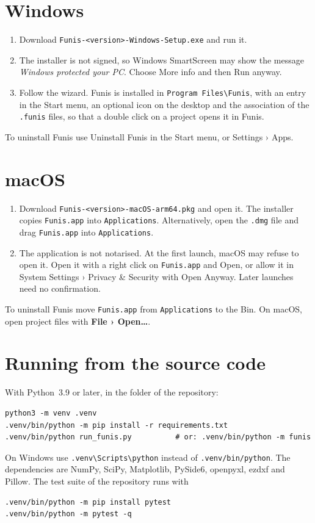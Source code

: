 \documentclass[fontsize=10.5pt,paper=a4,parskip=half,headings=normal,numbers=noenddot,
  open=any,bibliography=totoc,captions=tableheading]{scrreprt}
\numberwithin{figure}{chapter}
\numberwithin{table}{chapter}
\newcommand{\menu}[1]{{\sffamily\bfseries\color{ink}#1}}
\newcommand{\ui}[1]{{\sffamily\color{ink}#1}}
\newcommand{\file}[1]{\texttt{#1}}
\begin{document}
\section{Windows}

\begin{enumerate}
\item Download \file{Funis-<version>-Windows-Setup.exe} and run it.
\item The installer is not signed, so Windows SmartScreen may show the message \emph{Windows protected
your PC}. Choose \ui{More info} and then \ui{Run anyway}.
\item Follow the wizard. Funis is installed in \file{Program Files\textbackslash Funis}, with an entry
in the Start menu, an optional icon on the desktop and the association of the \file{.funis} files, so
that a double click on a project opens it in Funis.
\end{enumerate}
To uninstall Funis use \ui{Uninstall Funis} in the Start menu, or \ui{Settings › Apps}.

\section{macOS}

\begin{enumerate}
\item Download \file{Funis-<version>-macOS-arm64.pkg} and open it. The installer copies
\file{Funis.app} into \file{Applications}. Alternatively, open the \file{.dmg} file and drag
\file{Funis.app} into \file{Applications}.
\item The application is not notarised. At the first launch, macOS may refuse to open it. Open it with a
right click on \file{Funis.app} and \ui{Open}, or allow it in \ui{System Settings › Privacy \&
Security} with \ui{Open Anyway}. Later launches need no confirmation.
\end{enumerate}
To uninstall Funis move \file{Funis.app} from \file{Applications} to the Bin. On macOS, open project
files with \menu{File › Open…}.

\section{Running from the source code}\label{sec:source}

With Python~3.9 or later, in the folder of the repository:
\begin{verbatim}
python3 -m venv .venv
.venv/bin/python -m pip install -r requirements.txt
.venv/bin/python run_funis.py          # or: .venv/bin/python -m funis
\end{verbatim}
On Windows use \file{.venv\textbackslash Scripts\textbackslash python} instead of
\file{.venv/bin/python}. The dependencies are NumPy, SciPy, Matplotlib, PySide6, openpyxl, ezdxf and
Pillow. The test suite of the repository runs with
\begin{verbatim}
.venv/bin/python -m pip install pytest
.venv/bin/python -m pytest -q
\end{verbatim}
\end{document}
